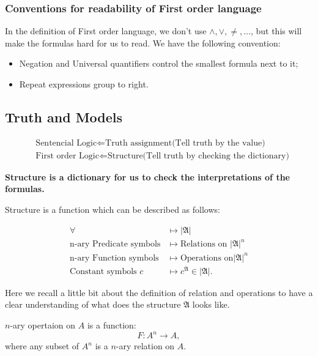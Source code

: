 \documentclass[11pt]{article}
\begin{document}
\subsubsection{Conventions for readability of First order language}
\label{sec:org4f78bac}
In the definition of First order language, we don't use \(\land, \lor, \neq, \dots\), but this will make the formulas hard for us to read. We have the following convention:
\begin{itemize}
\item Negation and Universal quantifiers control the smallest formula next to it;
\item Repeat expressions group to right.
\end{itemize}
\subsection{Truth and Models}
\label{sec:org5ff405d}

\begin{align*}
& \text{Sentencial Logic} \Leftarrow \text{Truth assignment(Tell truth by the value)} \\
& \text{First order Logic} \Leftarrow \text{Structure(Tell truth by checking the dictionary)}
\end{align*}

\textbf{Structure is a dictionary for us to check the interpretations of the formulas.}

\begin{definition}[Structure]
Structure is a function which can be described as follows:
\begin{center}
\begin{align*}
\forall &\mapsto \lvert\mathfrak{A}\rvert \\
\text{n-ary Predicate symbols} &\mapsto \text{Relations on } \lvert\mathfrak{A}\rvert^{n}\\
\text{n-ary Function symbols} &\mapsto \text{Operations on} \lvert\mathfrak{A}\rvert^{n}\\
\text{Constant symbols } c &\mapsto c^{\mathfrak{A}} \in \lvert\mathfrak{A}\rvert.
\end{align*}
\end{center}
\end{definition}

Here we recall a little bit about the definition of relation and operations to have a clear understanding of what does the structure \(\mathfrak{A}\) looks like.

\begin{definition}
\(n\)-ary opertaion on \(A\) is a function:
\[
F:A^n \to A,
\]
where any subset of \(A^n\) is a \(n\)-ary relation on \(A\).
\end{definition}
\end{document}
